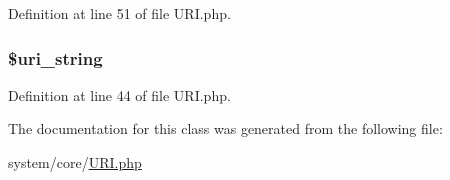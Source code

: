 Definition at line 51 of file U\-R\-I.\-php.

\hypertarget{class_c_i___u_r_i_ab908b3e655463a05e8a646c965ca4e53}{
\subsubsection[{\$uri\-\_\-string}]{\setlength{\rightskip}{0pt plus 5cm}\${\bf uri\-\_\-string}}}\label{class_c_i___u_r_i_ab908b3e655463a05e8a646c965ca4e53}


Definition at line 44 of file U\-R\-I.\-php.



The documentation for this class was generated from the following file\-:\begin{DoxyCompactItemize}
\item 
system/core/\hyperlink{_u_r_i_8php}{U\-R\-I.\-php}\end{DoxyCompactItemize}
